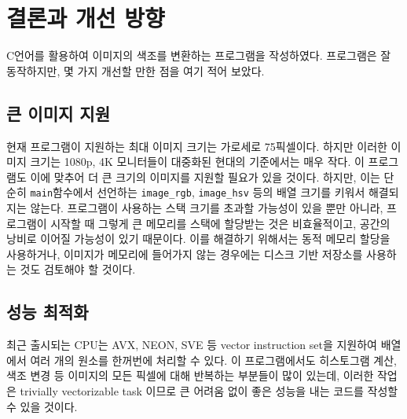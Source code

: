 \documentclass[titlepage]{article}
\begin{document}
\section{결론과 개선 방향}

C언어를 활용하여 이미지의 색조를 변환하는 프로그램을 작성하였다. 프로그램은 잘 동작하지만, 몇 가지 개선할 만한 점을 여기 적어 보았다.

\subsection{큰 이미지 지원}

현재 프로그램이 지원하는 최대 이미지 크기는 가로세로 75픽셀이다. 하지만 이러한 이미지 크기는 1080p, 4K 모니터들이 대중화된 현대의 기준에서는 매우 작다. 이 프로그램도 이에 맞추어 더 큰 크기의 이미지를 지원할 필요가 있을 것이다. 하지만, 이는 단순히 \texttt{main}함수에서 선언하는 \texttt{image\_rgb}, \texttt{image\_hsv} 등의 배열 크기를 키워서 해결되지는 않는다. 프로그램이 사용하는 스택 크기를 초과할 가능성이 있을 뿐만 아니라, 프로그램이 시작할 때 그렇게 큰 메모리를 스택에 할당받는 것은 비효율적이고, 공간의 낭비로 이어질 가능성이 있기 때문이다. 이를 해결하기 위해서는 동적 메모리 할당을 사용하거나, 이미지가 메모리에 들어가지 않는 경우에는 디스크 기반 저장소를 사용하는 것도 검토해야 할 것이다.

\subsection{성능 최적화}

최근 출시되는 CPU는 AVX, NEON, SVE 등 vector instruction set을 지원하여 배열에서 여러 개의 원소를 한꺼번에 처리할 수 있다. 이 프로그램에서도 히스토그램 계산, 색조 변경 등 이미지의 모든 픽셀에 대해 반복하는 부분들이 많이 있는데, 이러한 작업은 trivially vectorizable task 이므로 큰 어려움 없이 좋은 성능을 내는 코드를 작성할 수 있을 것이다.
\end{document}
